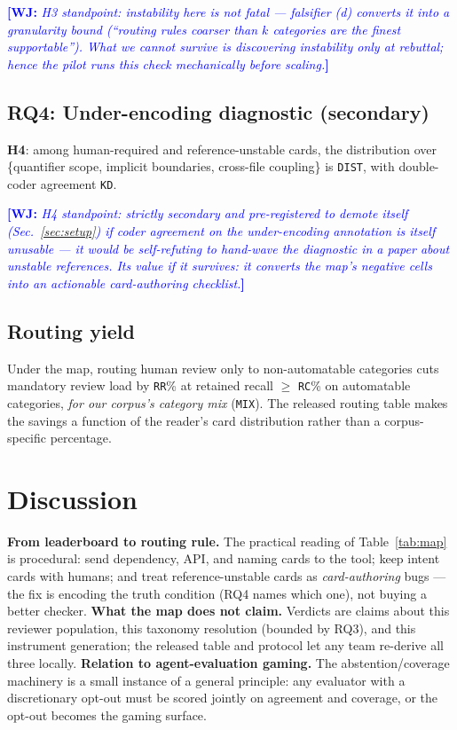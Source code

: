 \documentclass[conference]{IEEEtran}
\newcommand{\wj}[1]{\textcolor{blue}{\textbf{[WJ:} \textit{#1}\textbf{]}}}
\newcommand{\ph}[1]{\colorbox{yellow!35}{\texttt{\footnotesize #1}}}
\begin{document}
\wj{H3 standpoint: instability here is not fatal --- falsifier (d) converts it
into a granularity bound (``routing rules coarser than $k$ categories are the
finest supportable''). What we cannot survive is discovering instability only
at rebuttal; hence the pilot runs this check mechanically before scaling.}

\subsection{RQ4: Under-encoding diagnostic (secondary)}
\textbf{H4}: among human-required and reference-unstable cards, the
distribution over \{quantifier scope, implicit boundaries, cross-file
coupling\} is \ph{DIST}, with double-coder agreement \ph{KD}.

\wj{H4 standpoint: strictly secondary and pre-registered to demote itself
(Sec.~\ref{sec:setup}) if coder agreement on the under-encoding annotation is
itself unusable --- it would be self-refuting to hand-wave the diagnostic in a
paper about unstable references. Its value if it survives: it converts the
map's negative cells into an actionable card-authoring checklist.}

\subsection{Routing yield}
Under the map, routing human review only to non-automatable categories cuts
mandatory review load by \ph{RR}\% at retained recall $\geq$ \ph{RC}\% on
automatable categories, \emph{for our corpus's category mix}
(\ph{MIX}). The released routing table makes the savings a function of the
reader's card distribution rather than a corpus-specific percentage.

\section{Discussion}\label{sec:discussion}
\textbf{From leaderboard to routing rule.} The practical reading of
Table~\ref{tab:map} is procedural: send dependency, API, and naming cards to the
tool; keep intent cards with humans; and treat reference-unstable cards as
\emph{card-authoring} bugs --- the fix is encoding the truth condition
(RQ4 names which one), not buying a better checker.
\textbf{What the map does not claim.} Verdicts are claims about this reviewer
population, this taxonomy resolution (bounded by RQ3), and this instrument
generation; the released table and protocol let any team re-derive all three
locally.
\textbf{Relation to agent-evaluation gaming.} The abstention/coverage
machinery is a small instance of a general principle: any evaluator with a
discretionary opt-out must be scored jointly on agreement and coverage, or the
opt-out becomes the gaming surface.
\end{document}
